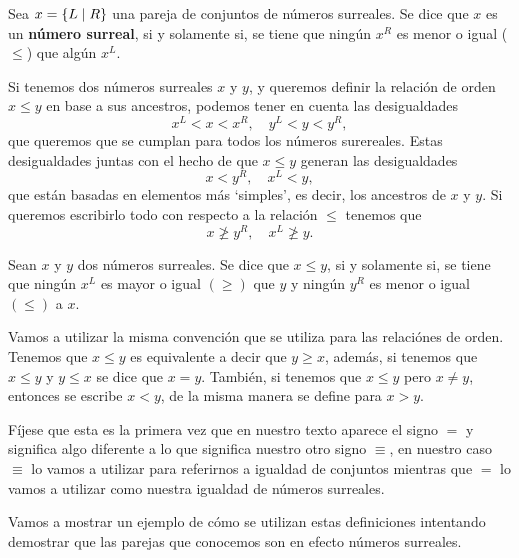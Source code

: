     \begin{definition}
        Sea $x=\left\{L\;\middle|\; R\right\}$ una pareja de conjuntos de n\'umeros surreales. Se dice que $x$ es un \textbf{n\'umero surreal}, si y solamente si, se tiene que ningún $x^R$ es menor o igual ($\le$) que algún $x^L$. 
    \end{definition}

    Si tenemos dos n\'umeros surreales $x$ y $y$, y queremos definir la relaci\'on de orden $x\le y$ en base a sus ancestros, podemos tener en cuenta las desigualdades
    \[
        x^L < x < x^R,\quad y^L < y < y^R,
    \]
    que queremos que se cumplan para todos los n\'umeros surereales. Estas desigualdades juntas con el hecho de que $x\le y$ generan las desigualdades
    \[
        x < y^R,\quad x^L < y,
    \]
    que est\'an basadas en elementos m\'as `simples', es decir, los ancestros de $x$ y $y$. Si queremos escribirlo todo con respecto a la relaci\'on $\le$ tenemos que
    \[
        x \not\ge y^R,\quad x^L \not\ge y.
    \]

    \begin{definition}
        Sean $x$ y $y$ dos n\'umeros surreales. Se dice que $x\le y$, si y solamente si, se tiene que ning\'un $x^L$ es mayor o igual $(\ge)$ que $y$ y ningún $y^R$ es menor o igual $(\le)$ a $x$.
    \end{definition}

    Vamos a utilizar la misma convenci\'on que se utiliza para las relaci\'ones de orden. Tenemos que $x\le y$ es equivalente a decir que $y\ge x$, adem\'as, si tenemos que $x\le y$ y $y\le x$ se dice que $x=y$. Tambi\'en, si tenemos que $x\le y$ pero $x \not= y$, entonces se escribe $x < y$, de la misma manera se define para $x > y$.

    F\'ijese que esta es la primera vez que en nuestro texto aparece el signo $=$ y significa algo diferente a lo que significa nuestro otro signo $\equiv$, en nuestro caso $\equiv$ lo vamos a utilizar para referirnos a igualdad de conjuntos mientras que $=$ lo vamos a utilizar como nuestra igualdad de n\'umeros surreales.

    Vamos a mostrar un ejemplo de c\'omo se utilizan estas definiciones intentando demostrar que las parejas que conocemos son en efecto n\'umeros surreales.

